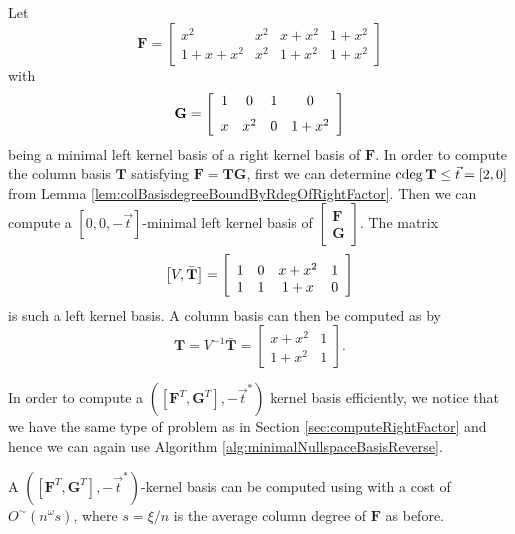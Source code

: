 \begin{example}
Let 
\[
\mathbf{F}=\left[\begin{array}{cccc}
x^{2} & x^{2} & x+x^{2} & 1+x^{2}\\
1+x+x^{2} & x^{2} & 1+x^{2} & 1+x^{2}
\end{array}\right]
\]
with 
\[
\mathbf{G}=\left[\begin{array}{cccc}
1 & 0 & 1 & 0\\
\noalign{\medskip}x & {x}^{2} & 0 & 1+{x}^{2}
\end{array}\right]
\]
being a minimal left kernel basis of a right kernel basis of $\mathbf{F}$.
In order to compute the column basis $\mathbf{T}$ satisfying $\mathbf{F}=\mathbf{T}\mathbf{G}$,
first we can determine $\cdeg\mathbf{T}\le\vec{t}=\left[2,0\right]$
from Lemma \ref{lem:colBasisdegreeBoundByRdegOfRightFactor}. Then
we can compute a $\left[0,0,-\vec{t}\right]$-minimal left kernel
basis of $\begin{bmatrix}\mathbf{F}\\
\mathbf{G}
\end{bmatrix}$. The matrix 
\[
\left[V,\bar{\mathbf{T}}\right]=\left[\begin{array}{cccc}
\noalign{\medskip}1 & 0 & x+{x}^{2} & 1\\
1 & 1 & 1+x & 0
\end{array}\right]
\]
is such a left kernel basis. A column basis can then be computed as
by 
\[
\mathbf{T}=V^{-1}\bar{\mathbf{T}}=\left[\begin{array}{cc}
x+x^{2} & 1\\
1+{x}^{2} & 1
\end{array}\right].
\]

\end{example}
In order to compute a $\left(\left[\mathbf{F}^{T},\mathbf{G}^{T}\right],-\vec{t}^{*}\right)$
kernel basis efficiently, we notice that we have the same type of
problem as in Section \ref{sec:computeRightFactor} and hence we can
again use Algorithm \ref{alg:minimalNullspaceBasisReverse}. 
\begin{lem}
\label{lem:costOfKernelBasisReversedForLeftFactor}A $\left(\left[\mathbf{F}^{T},\mathbf{G}^{T}\right],-\vec{t}^{*}\right)$-kernel
basis can be computed using 
with a cost of $O^{\sim}\left(n^{\omega}s\right)$, where $s=\xi/n$
is the average column degree of $\mathbf{F}$ as before. \end{lem}
